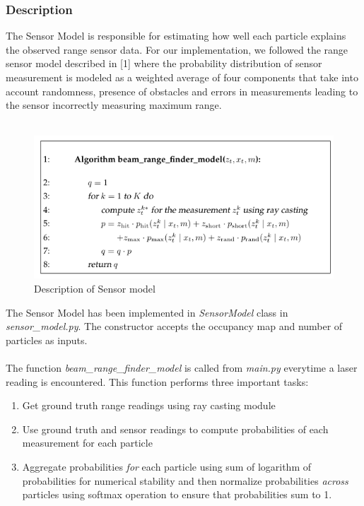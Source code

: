 \documentclass[12pt, a4paper]{article}
\begin{document}
\subsubsection{Description}
The Sensor Model is responsible for estimating how well each particle explains the observed range sensor data. For our implementation, we followed the range sensor model described in [1] where the probability distribution of sensor measurement is modeled as a weighted average of four components that take into account randomness, presence of obstacles and errors in measurements leading to the sensor incorrectly measuring maximum range. \\\\
\begin{figure}[H]
  \centering
  \includegraphics[width=0.9\linewidth]{results/sensor_model_desc.png}
  \caption{Description of Sensor model}
\end{figure}
The Sensor Model has been implemented in \textit{SensorModel} class in \textit{sensor\_model.py}. The constructor accepts the occupancy map and number of particles as inputs.\\\\
The function \textit{beam\_range\_finder\_model} is called from \textit{main.py} everytime a laser reading is encountered. This function performs three important tasks:
\begin{enumerate}
  \item Get ground truth range readings using ray casting module
  \item Use ground truth and sensor readings to compute probabilities of each measurement for each particle
  \item Aggregate probabilities \textit{for} each particle using sum of logarithm of probabilities for numerical stability and then normalize probabilities \textit{across} particles using softmax operation to ensure that probabilities sum to 1.
\end{enumerate}
\end{document}
